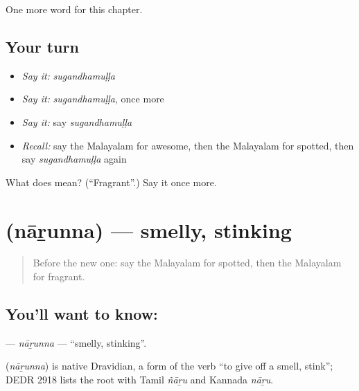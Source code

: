 \begin{grammarlens}[title={What you've built}]
One more word for this chapter.
\end{grammarlens}

\subsection*{Your turn}
\begin{itemize}
\raggedright
  \item \emph{Say it:} \emph{sugandhamuḷḷa}
  \item \emph{Say it:} \emph{sugandhamuḷḷa}, once more
  \item \emph{Say it:} say \emph{sugandhamuḷḷa}
  \item \emph{Recall:} say the Malayalam for awesome, then the Malayalam for spotted, then say \emph{sugandhamuḷḷa} again
\end{itemize}

\begin{tcolorbox}[breakable,colback=teal!4,colframe=teal!35!black,title={Before you move on}]
What does  mean? (\textquotedblleft{}Fragrant\textquotedblright{}.) Say it once more.
\end{tcolorbox}
\section[\texorpdfstring{\ml{നാറുന്ന} (nāṟunna)}{നാറുന്ന (nāṟunna)}]{ (nāṟunna) — smelly, stinking}

\label{lesson:ML-C321-narunna}



\begin{quote}
Before the new one: say the Malayalam for spotted, then the Malayalam for fragrant.
\end{quote}

\subsection*{You'll want to know: }
\textbf{} — \emph{nāṟunna} — \textquotedblleft{}smelly, stinking\textquotedblright{}.

\begin{cousinweb}
\textbf{} (\emph{nāṟunna}) is native Dravidian, a form of the verb \textquotedblleft{}to give off a smell, stink\textquotedblright{}; DEDR 2918 lists the root with Tamil \emph{ñāṟu} and Kannada \emph{nāṟu}.
\end{cousinweb}


